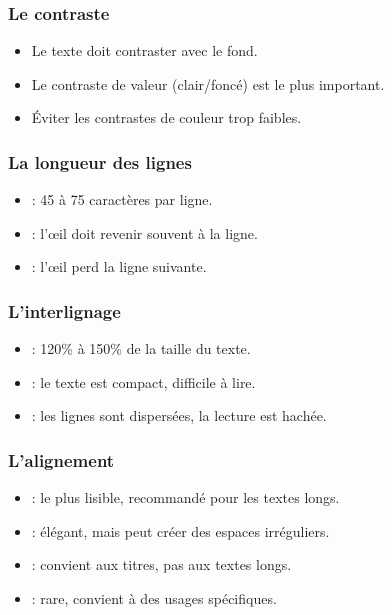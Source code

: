 \subsubsection{Le contraste}

\begin{itemize}
    \item Le texte doit contraster avec le fond.
    \item Le contraste de valeur (clair/foncé) est le plus important.
    \item Éviter les contrastes de couleur trop faibles.
\end{itemize}

\subsubsection{La longueur des lignes}

\begin{itemize}
    \item {} : 45 à 75 caractères par ligne.
    \item {} : l'œil doit revenir souvent à la ligne.
    \item {} : l'œil perd la ligne suivante.
\end{itemize}

\subsubsection{L'interlignage}

\begin{itemize}
    \item {} : 120\% à 150\% de la taille du texte.
    \item {} : le texte est compact, difficile à lire.
    \item {} : les lignes sont dispersées, la lecture est hachée.
\end{itemize}

\subsubsection{L'alignement}

\begin{itemize}
    \item {} : le plus lisible, recommandé pour les textes longs.
    \item {} : élégant, mais peut créer des espaces irréguliers.
    \item {} : convient aux titres, pas aux textes longs.
    \item {} : rare, convient à des usages spécifiques.
\end{itemize}

